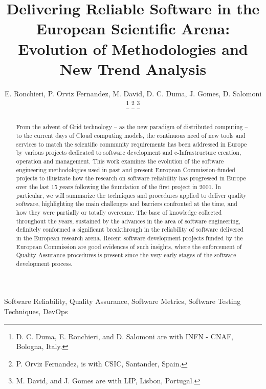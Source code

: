 \documentclass[journal]{IEEEtran}
\begin{document}
\title{Delivering Reliable Software in the European Scientific Arena: Evolution of Methodologies and New Trend Analysis}

\author{E. Ronchieri,
        P. Orviz Fernandez,
        M. David,
	D. C. Duma,
        J. Gomes,
        D. Salomoni
\thanks{D. C. Duma, E. Ronchieri, and D. Salomoni are with INFN - CNAF, Bologna, Italy.}
\thanks{P. Orviz Fernandez, is with CSIC, Santander, Spain.}
\thanks{M. David, and J. Gomes are with LIP, Lisbon, Portugal.}%
}


\maketitle

\begin{abstract}
From the advent of Grid technology -- as the new paradigm of distributed
computing -- to the current days of Cloud computing models, the continuous need
of new tools and services to match the scientific community requirements has been
addressed in Europe by various projects dedicated to software development
and e-Infrastructure creation, operation and management.
This work examines the evolution of the software engineering methodologies used in past and
present European Commission-funded projects to illustrate how the research on software
reliability has progressed in Europe over the last 15 years following the foundation of the
first project in 2001. In particular, we will summarize the techniques and procedures
applied to deliver quality software, highlighting the main challenges and barriers confronted
at the time, and how they were partially or totally overcome. The base of knowledge collected
throughout the years, sustained by the advances in the area of software engineering,
definitely conformed a significant breakthrough in the reliability of software delivered in the
European research arena. Recent software development projects funded by the European
Commission are good evidences of such insights, where the enforcement of Quality Assurance
procedures is present since the very early stages of the software development process.
\end{abstract}

\begin{IEEEkeywords}
Software Reliability, Quality Assurance, Software Metrics, Software Testing
Techniques, DevOps
\end{IEEEkeywords}
\end{document}

